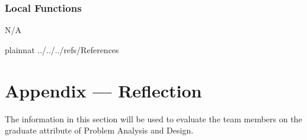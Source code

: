 \documentclass[12pt, titlepage]{article}
\begin{document}
\subsubsection{Local Functions}

N/A


\newpage

 {plainnat}
 {../../../refs/References}

\newpage

\newpage{}

\section*{Appendix --- Reflection}

The information in this section will be used to evaluate the team members on the
graduate attribute of Problem Analysis and Design.


\end{document}
